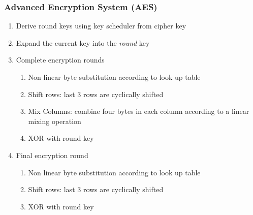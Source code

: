 \documentclass{beamer}
\begin{document}
\begin{frame}
    \frametitle{Advanced Encryption System (AES)}
    \begin{enumerate}
        \item \pause Derive round keys using key scheduler from cipher key \pause
        \item Expand the current key into the \textit{round} key \pause
        \item Complete encryption rounds \pause
        \begin{enumerate}
            \item Non linear byte substitution according to look up table\pause
            \item Shift rows: last 3 rows are cyclically shifted\pause
            \item Mix Columns: combine four bytes in each column according to a linear mixing operation\pause
            \item XOR with round key
        \end{enumerate}
        \item Final encryption round\pause
        \begin{enumerate}
            \item Non linear byte substitution according to look up table\pause
            \item Shift rows: last 3 rows are cyclically shifted\pause
            \item XOR with round key\pause
        \end{enumerate}
    \end{enumerate}
\end{frame}
\end{document}
